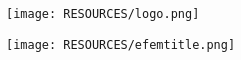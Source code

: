 \begin{titlepage}
\thispagestyle{fancy}
	\centering
	\texttt{[image: RESOURCES/logo.png]}\par
	\vspace{0.7cm}
			
	\begin{flushright}
		{\fontsize{30}{36}\selectfont\expandafter \MakeUppercase \expandafter{\DocumentName} \par}
		\vspace{1.0cm}
	\end{flushright}
			
	\begin{adjustwidth}{-2.6cm}{}
		\vspace{0.2cm}
		\texttt{[image: RESOURCES/efemtitle.png]}
	\end{adjustwidth}
\end{titlepage}